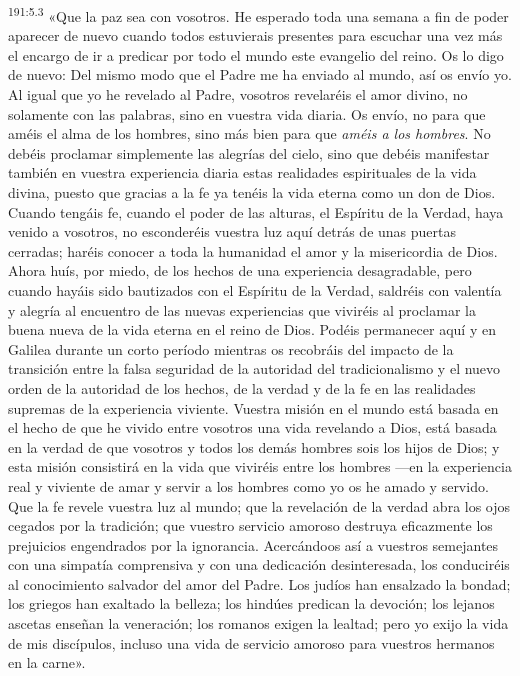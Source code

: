 \par 
\textsuperscript{191:5.3} «Que la paz sea con vosotros. He esperado toda una semana a fin de poder aparecer de nuevo cuando todos estuvierais presentes para escuchar una vez más el encargo de ir a predicar por todo el mundo este evangelio del reino. Os lo digo de nuevo: Del mismo modo que el Padre me ha enviado al mundo, así os envío yo. Al igual que yo he revelado al Padre, vosotros revelaréis el amor divino, no solamente con las palabras, sino en vuestra vida diaria. Os envío, no para que améis el alma de los hombres, sino más bien para que \textit{améis a los hombres}. No debéis proclamar simplemente las alegrías del cielo, sino que debéis manifestar también en vuestra experiencia diaria estas realidades espirituales de la vida divina, puesto que gracias a la fe ya tenéis la vida eterna como un don de Dios. Cuando tengáis fe, cuando el poder de las alturas, el Espíritu de la Verdad, haya venido a vosotros, no esconderéis vuestra luz aquí detrás de unas puertas cerradas; haréis conocer a toda la humanidad el amor y la misericordia de Dios. Ahora huís, por miedo, de los hechos de una experiencia desagradable, pero cuando hayáis sido bautizados con el Espíritu de la Verdad, saldréis con valentía y alegría al encuentro de las nuevas experiencias que viviréis al proclamar la buena nueva de la vida eterna en el reino de Dios. Podéis permanecer aquí y en Galilea durante un corto período mientras os recobráis del impacto de la transición entre la falsa seguridad de la autoridad del tradicionalismo y el nuevo orden de la autoridad de los hechos, de la verdad y de la fe en las realidades supremas de la experiencia viviente. Vuestra misión en el mundo está basada en el hecho de que he vivido entre vosotros una vida revelando a Dios, está basada en la verdad de que vosotros y todos los demás hombres sois los hijos de Dios; y esta misión consistirá en la vida que viviréis entre los hombres ---en la experiencia real y viviente de amar y servir a los hombres como yo os he amado y servido. Que la fe revele vuestra luz al mundo; que la revelación de la verdad abra los ojos cegados por la tradición; que vuestro servicio amoroso destruya eficazmente los prejuicios engendrados por la ignorancia. Acercándoos así a vuestros semejantes con una simpatía comprensiva y con una dedicación desinteresada, los conduciréis al conocimiento salvador del amor del Padre. Los judíos han ensalzado la bondad; los griegos han exaltado la belleza; los hindúes predican la devoción; los lejanos ascetas enseñan la veneración; los romanos exigen la lealtad; pero yo exijo la vida de mis discípulos, incluso una vida de servicio amoroso para vuestros hermanos en la carne».

